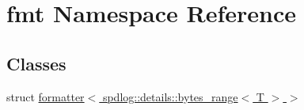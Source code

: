 \hypertarget{namespacefmt}{}\section{fmt Namespace Reference}
\label{namespacefmt}
\subsection*{Classes}
\begin{DoxyCompactItemize}
\item 
struct \hyperlink{structfmt_1_1formatter_3_01spdlog_1_1details_1_1bytes__range_3_01_t_01_4_01_4}{formatter$<$ spdlog\+::details\+::bytes\+\_\+range$<$ T $>$ $>$}
\end{DoxyCompactItemize}
